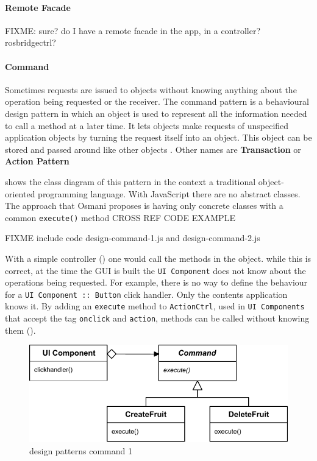 \paragraph{Remote Facade} FIXME: sure? do I have a remote facade in the app, in a controller? rosbridgectrl?

\paragraph{Command} 
Sometimes requests are issued to objects without knowing anything about the operation being requested or the receiver.
The command pattern is a behavioural design pattern in which an object is used to represent all the information needed to call a method at a later time. 
It lets objects make requests of unspecified application objects by turning the request itself into an object.
This object can be stored and passed around like other objects \cite{GoF:1995}.
Other names are \textbf{Transaction} or \textbf{Action Pattern}  

 shows the class diagram of this pattern in the context a traditional object-oriented programming language.
With JavaScript there are no abstract classes.
The approach that Osmani proposes is having only concrete classes with a common \texttt{execute()} method \cite{Osmani:2012} CROSS REF CODE EXAMPLE

FIXME include code design-command-1.js and design-command-2.js

With a simple controller () one would call the methods in the object.
while this is correct, at the time the \ac{GUI} is built the \texttt{UI Component} does not know about the operations being requested.
For example, there is no way to define the behaviour for a \texttt{UI Component :: Button} click handler.
Only the contents application knows it.
By adding an \texttt{execute} method to \texttt{ActionCtrl}, used in \texttt{UI Components} that accept the tag \texttt{onclick} and \texttt{action}, methods can be called without knowing them ().

\begin{figure}[htb]
    \centering
    \includegraphics{figures/design-patterns-command-1.pdf}
    \caption{design patterns command 1}
    \label{fig:design-command-general}
\end{figure}

